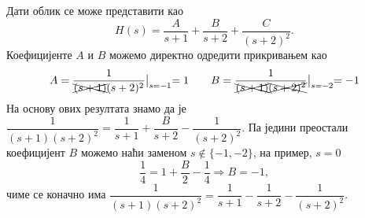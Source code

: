 Дати облик се може представити као 
\begin{equation}
    H(s) = \dfrac{A}{s + 1} + \dfrac{B}{s+2} + \dfrac{C}{(s+2)^2}.
\end{equation}
Коефицијенте $A$ и $B$ можемо директно одредити прикривањем као 
\begin{eqnarray}
    A = \dfrac{1}{ \xcancel{(s+1)}(s+2)^2} \bigl|_{s = -1} = 1 \qquad
    B = \dfrac{1}{ \xcancel{(s+1)}\xcancel{(s+2)^2}} \bigl|_{s = -2} = -1
\end{eqnarray}
На основу ових резултата знамо да је
$ \dfrac{1}{(s+1)(s+2)^2} = \dfrac{1}{s + 1} + \dfrac{B}{s+2} - \dfrac{1}{(s+2)^2}$. Па једини преостали коефицијент 
$B$ можемо наћи заменом $s \not\in \{-1, -2\}$, на пример, $s = 0$ 
\begin{equation}
    \dfrac{1}{4} = 1 + \dfrac{B}{2} - \dfrac{1}{4} \Rightarrow B = -1, 
\end{equation}
чиме се коначно има 
$ \dfrac{1}{(s+1)(s+2)^2} = \dfrac{1}{s + 1} - \dfrac{1}{s+2} - \dfrac{1}{(s+2)^2}$.